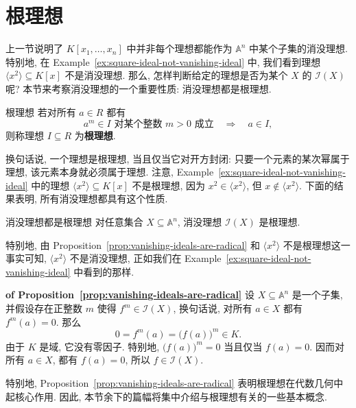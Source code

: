 \section{根理想}\label{sec:radical-ideals}

上一节说明了 $K[x_{1},\ldots,x_{n}]$ 中并非每个理想都能作为 $\mathbb{A}^{n}$ 中某个子集的消没理想. 特别地, 在 Example~\ref{ex:square-ideal-not-vanishing-ideal} 中, 我们看到理想 $\langle x^{2}\rangle\subseteq K[x]$ 不是消没理想. 那么, 怎样判断给定的理想是否为某个 $X$ 的 $\mathcal{I}(X)$ 呢? 本节来考察消没理想的一个重要性质: 消没理想都是根理想.

\begin{Definition}{根理想}\leavevmode\label{def:radical-ideal}
  若对所有 $a\in R$ 都有
  \[
    a^{m}\in I\text{ 对某个整数 }m>0\text{ 成立}
    \quad\Longrightarrow\quad a\in I,
  \]
  则称理想 $I\subseteq R$ 为\textbf{根理想}.
\end{Definition}

换句话说, 一个理想是根理想, 当且仅当它对开方封闭: 只要一个元素的某次幂属于理想, 该元素本身就必须属于理想. 注意, Example~\ref{ex:square-ideal-not-vanishing-ideal} 中的理想 $\langle x^{2}\rangle\subseteq K[x]$ 不是根理想, 因为 $x^{2}\in\langle x^{2}\rangle$, 但 $x\notin\langle x^{2}\rangle$. 下面的结果表明, 所有消没理想都具有这个性质.

\begin{Proposition}{消没理想都是根理想}\leavevmode\label{prop:vanishing-ideals-are-radical}
  对任意集合 $X\subseteq\mathbb{A}^{n}$, 消没理想 $\mathcal{I}(X)$ 是根理想.
\end{Proposition}

特别地, 由 Proposition~\ref{prop:vanishing-ideals-are-radical} 和 $\langle x^{2}\rangle$ 不是根理想这一事实可知, $\langle x^{2}\rangle$ 不是消没理想, 正如我们在 Example~\ref{ex:square-ideal-not-vanishing-ideal} 中看到的那样.

\begin{Proof}\unskip\textbf{ of Proposition~\ref{prop:vanishing-ideals-are-radical}}\quad
  设 $X\subseteq\mathbb{A}^{n}$ 是一个子集, 并假设存在正整数 $m$ 使得 $f^{m}\in\mathcal{I}(X)$, 换句话说, 对所有 $a\in X$ 都有 $f^{m}(a)=0$. 那么
  \[
    0=f^{m}(a)=\bigl(f(a)\bigr)^{m}\in K.
  \]
  由于 $K$ 是域, 它没有零因子. 特别地, $\bigl(f(a)\bigr)^{m}=0$ 当且仅当 $f(a)=0$. 因而对所有 $a\in X$, 都有 $f(a)=0$, 所以 $f\in\mathcal{I}(X)$.
\end{Proof}

特别地, Proposition~\ref{prop:vanishing-ideals-are-radical} 表明根理想在代数几何中起核心作用. 因此, 本节余下的篇幅将集中介绍与根理想有关的一些基本概念.

